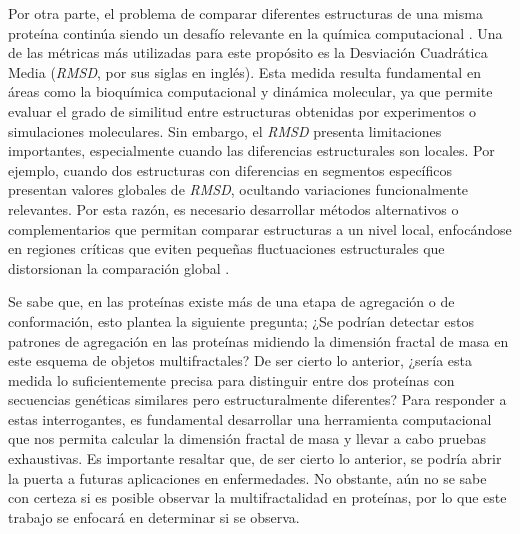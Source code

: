 Por otra parte, el problema de comparar diferentes estructuras de una misma prote\'{i}na contin\'{u}a siendo un desaf\'{i}o relevante en la qu\'{i}mica computacional \cite{Kufareva2012}. Una de las m\'{e}tricas m\'{a}s utilizadas para este prop\'{o}sito es la Desviaci\'{o}n Cuadr\'{a}tica Media (\textit{RMSD}, por sus siglas en ingl\'{e}s). Esta medida resulta fundamental en \'{a}reas como la bioqu\'{i}mica computacional y dinámica molecular, ya que permite evaluar el grado de similitud entre estructuras obtenidas por experimentos o simulaciones moleculares. Sin embargo, el \textit{RMSD} presenta limitaciones importantes, especialmente cuando las diferencias estructurales son locales. Por ejemplo, cuando dos estructuras con diferencias en segmentos espec\'{i}ficos  presentan valores globales de \textit{RMSD}, ocultando variaciones funcionalmente relevantes. Por esta raz\'{o}n, es necesario desarrollar m\'{e}todos alternativos o complementarios que permitan comparar estructuras a un nivel local, enfoc\'{a}ndose en regiones cr\'{i}ticas que eviten pequeñas fluctuaciones estructurales que distorsionan la comparaci\'{o}n global \cite{Kufareva2012}.

Se sabe que, en las prote\'{i}nas existe m\'{a}s de una etapa de agregaci\'{o}n o de conformaci\'{o}n, esto plantea la siguiente pregunta; ¿Se podr\'{i}an detectar estos patrones de agregaci\'{o}n en las prote\'{i}nas midiendo la dimensi\'{o}n fractal de masa en este esquema de objetos multifractales? De ser cierto lo anterior, ¿ser\'{i}a esta medida lo suficientemente precisa para distinguir entre dos prote\'{i}nas con secuencias gen\'{e}ticas similares pero estructuralmente diferentes? Para responder a estas interrogantes, es fundamental desarrollar una herramienta computacional que nos permita calcular la dimensi\'{o}n fractal de masa y llevar a cabo pruebas exhaustivas. Es importante resaltar que, de ser cierto lo anterior, se podr\'{i}a abrir la puerta a futuras aplicaciones en enfermedades. No obstante, a\'{u}n no se sabe con certeza si es posible observar la multifractalidad en prote\'{i}nas, por lo que este trabajo se enfocar\'{a} en determinar si se observa.



